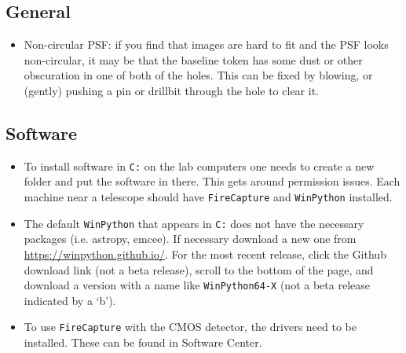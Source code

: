 \documentclass[11pt]{article}
\begin{document}
\subsection{General}

\begin{itemize}
    \item Non-circular PSF: if you find that images are hard to fit and the PSF looks non-circular, it may be that the baseline token has some dust or other obscuration in one of both of the holes. This can be fixed by blowing, or (gently) pushing a pin or drillbit through the hole to clear it.
\end{itemize}

\subsection{Software}

\begin{itemize}
    \item To install software in \texttt{C:} on the lab computers one needs to create a new folder and put the software in there. This gets around permission issues. Each machine near a telescope should have \texttt{FireCapture} and \texttt{WinPython} installed.

    \item The default \texttt{WinPython} that appears in \texttt{C:} does not have the necessary packages (i.e. astropy, emcee). If necessary download a new one from \href{https://winpython.github.io/}{https://winpython.github.io/}. For the most recent release, click the Github download link (not a beta release), scroll to the bottom of the page, and download a version with a name like \texttt{WinPython64-X} (not a beta release indicated by a `b').

    \item To use \texttt{FireCapture} with the CMOS detector, the drivers need to be installed. These can be found in Software Center.
\end{itemize}

\clearpage



\end{document}
